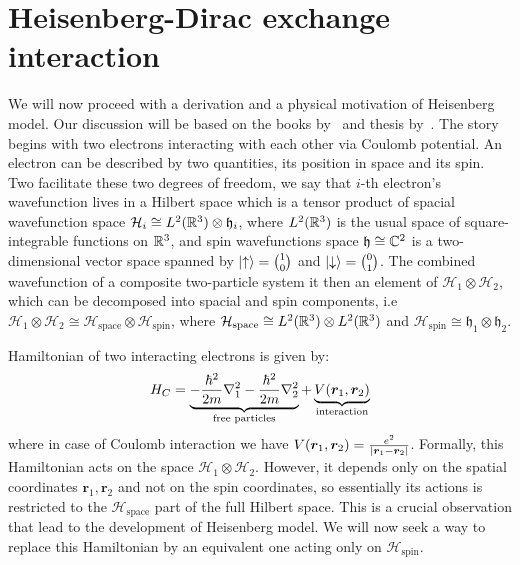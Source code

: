 \section{Heisenberg-Dirac exchange interaction}
We will now proceed with a derivation and a physical motivation of Heisenberg model.
Our discussion will be based on the books by~\textcite{spalek2015} and 
thesis by~\textcite{Ng2011HeisenbergM}.
The story begins with two electrons interacting with each other via Coulomb potential.
An electron can be described by two quantities, its position in space and its spin.
Two facilitate these two degrees of freedom, we say that \(i\)-th electron's wavefunction
lives in a Hilbert space which is a tensor product of spacial 
wavefunction space \(\mathcal{H}_i \cong L^2(\mathbb{R}^3) \otimes \mathfrak{h}_i \), where
\(L^2(\mathbb{R}^3)\) is the usual space of square-integrable functions on \(\mathbb{R}^3\),
and spin wavefunctions space \(\mathfrak{h} \cong \mathbb{C}^2\) is a two-dimensional vector space spanned by
\(\ket{\uparrow} = \binom{1}{0} \) and \(\ket{\downarrow} = \binom{0}{1}\).
The combined wavefunction of a composite two-particle system it then an element of
\(\mathcal{H}_1 \otimes \mathcal{H}_2\), which can be decomposed into spacial and spin
components, i.e\ \(\mathcal{H}_1 \otimes \mathcal{H}_2 \cong\mathcal{H}_{\mathrm{space}} 
\otimes \mathcal{H}_{\mathrm{spin}}\), where \(\mathcal{H}_{\mathrm{space}} 
\cong L^2(\mathbb{R}^3) \otimes L^2(\mathbb{R}^3)\) and \(\mathcal{H}_{\mathrm{spin}} \cong
\mathfrak{h}_1 \otimes \mathfrak{h}_2\). 

Hamiltonian of two interacting electrons is given by:
\begin{equation}
    H_C = \underbrace{-\frac{\hbar^2}{2m} \laplacian_1  
    -\frac{\hbar^2}{2m} \laplacian_2 }_{\textrm{free particles}}
     + \underbrace{V(\bm{r}_1,\bm{r}_2)}_{\textrm{interaction}}
     \label{eq:Coulomb Hamiltonian}
\end{equation}
where in case of Coulomb interaction we have \(V(\bm{r}_1,\bm{r}_2)=\frac{e^2}
{\abs{\bm{r}_1-\bm{r}_2}}\).
Formally, this Hamiltonian acts on the space \(\mathcal{H}_1 \otimes \mathcal{H}_2\).
However, it depends only on the spatial coordinates \(\bm{r}_1,\bm{r}_2\) and not on
the spin coordinates, so essentially
its actions is restricted to the \(\mathcal{H}_{\textrm{space}}\) part of the full Hilbert space.
This is a crucial observation that lead to the development of Heisenberg model. We will now
seek a way to replace this Hamiltonian by an equivalent one acting only on 
\(\mathcal{H}_{\textrm{spin}}\).

